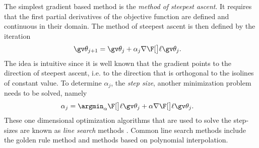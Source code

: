 The simplest gradient based method is the \emph{method of steepest ascent}.
It requires that the first partial derivatives of the objective function are defined
and continuous in their domain. The method of steepest ascent is then defined
by the iteration
\begin{align}
	\Th_{j+1}&=\Th_j+\alpha_j\nabla\lLH[\Th_j].
	\label{eq:steepest_descent}
\end{align}
The idea is intuitive since it is well known that the gradient
points to the direction of steepest ascent, i.e. to the direction
that is orthogonal to the isolines of constant value.
To determine $\alpha_j$, the \emph{step size}, another minimization problem needs to be solved,
namely
\begin{align}
	\alpha_j &= \argmin_\alpha \lLH[\Th_j+\alpha\nabla\lLH[\Th_j]].
	\label{eq:line_search}
\end{align}
These one dimensional optimization algorithms that are used
to solve the step-sizes are known as \emph{line search} methods \parencite{luenberger2008}.
Common line search methods include the golden rule method and 
methods based on polynomial interpolation.

